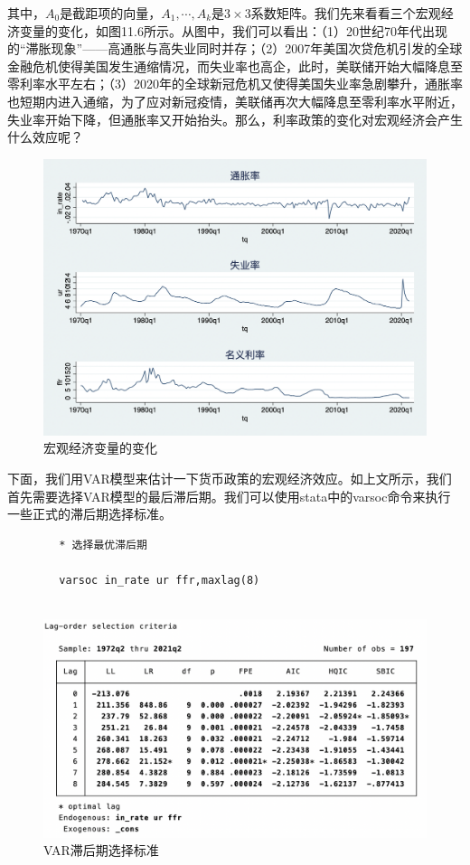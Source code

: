 \documentclass[cn,12pt,math=newtx,citestyle=gb7714-2015,bibstyle=gb7714-2015]{elegantbook}
\begin{document}
    其中，$A_0$是截距项的向量，$A_1,\cdots, A_k$是$3 \times 3$系数矩阵。我们先来看看三个宏观经济变量的变化，如图11.6所示。从图中，我们可以看出：（1）20世纪70年代出现的“滞胀现象”——高通胀与高失业同时并存；（2）2007年美国次贷危机引发的全球金融危机使得美国发生通缩情况，而失业率也高企，此时，美联储开始大幅降息至零利率水平左右；（3）2020年的全球新冠危机又使得美国失业率急剧攀升，通胀率也短期内进入通缩，为了应对新冠疫情，美联储再次大幅降息至零利率水平附近，失业率开始下降，但通胀率又开始抬头。那么，利率政策的变化对宏观经济会产生什么效应呢？
    
    \begin{figure}[tbph]
    	\centering
    	\includegraphics[width=1\linewidth]{var_ts}
    	\caption{宏观经济变量的变化}
    	\label{fig:varts}
    \end{figure}
    
    下面，我们用VAR模型来估计一下货币政策的宏观经济效应。如上文所示，我们首先需要选择VAR模型的最后滞后期。我们可以使用stata中的varsoc命令来执行一些正式的滞后期选择标准。
    
    \begin{lstlisting}
    	* 选择最优滞后期
    	
    	varsoc in_rate ur ffr,maxlag(8)
    	
    \end{lstlisting}


\begin{figure}[tbph]
	\centering
	\includegraphics[width=1\linewidth]{lagsc}
	\caption{VAR滞后期选择标准}
	\label{fig:lagsc}
\end{figure}
\end{document}
